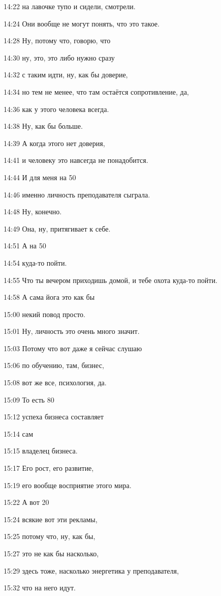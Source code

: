 14:22
на лавочке тупо и сидели, смотрели.

14:24
Они вообще не могут понять, что это такое.

14:28
Ну, потому что, говорю, что

14:30
ну, это, это либо нужно сразу

14:32
с таким идти, ну, как бы доверие,

14:34
но тем не менее, что там остаётся сопротивление, да,

14:36
как у этого человека всегда.

14:38
Ну, как бы больше.

14:39
А когда этого нет доверия,

14:41
и человеку это навсегда не понадобится.

14:44
И для меня на 50%

14:46
именно личность преподавателя сыграла.

14:48
Ну, конечно.

14:49
Она, ну, притягивает к себе.

14:51
А на 50%

14:54
куда-то пойти.

14:55
Что ты вечером приходишь домой, и тебе охота куда-то пойти.

14:58
А сама йога это как бы

15:00
некий повод просто.

15:01
Ну, личность это очень много значит.

15:03
Потому что вот даже я сейчас слушаю

15:06
по обучению, там, бизнес,

15:08
вот же все, психология, да.

15:09
То есть 80%

15:12
успеха бизнеса составляет

15:14
сам

15:15
владелец бизнеса.

15:17
Его рост, его развитие,

15:19
его вообще восприятие этого мира.

15:22
А вот 20%

15:24
всякие вот эти рекламы,

15:25
потому что, ну, как бы,

15:27
это не как бы насколько,

15:29
здесь тоже, насколько энергетика у преподавателя,

15:32
что на него идут.

